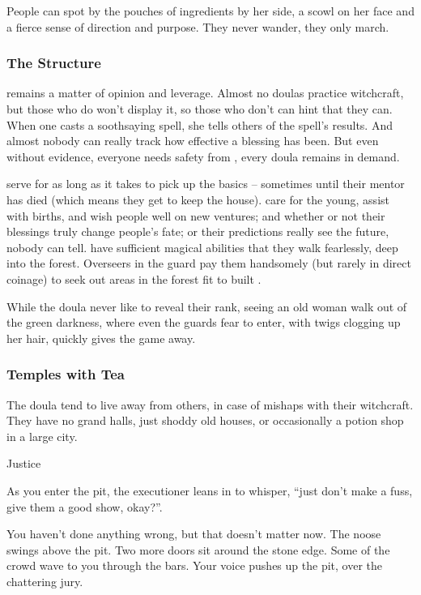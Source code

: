 \begin{multicols}{2}
People can spot  by the pouches of \glspl{ingredient} by her side, a scowl on her face and a fierce sense of direction and purpose.
They never wander, they only march.

\subsubsection{The Structure}
remains a matter of opinion and leverage.
Almost no \glspl{doula} practice \gls{witchcraft}, but those who do won't display it, so those who don't can hint that they can.
When one casts a soothsaying spell, she tells others of the spell's results.
And almost nobody can really track how effective a blessing has been.
But even without evidence, everyone needs safety from \hphantom{Nulla}, every \gls{doula} remains in demand.

\begin{description}
  serve for as long as it takes to pick up the basics -- sometimes until their mentor has died (which means they get to keep the house).
  care for the young, assist with births, and wish people well on new ventures; and whether or not their blessings truly change people's fate; or their predictions really see the future, nobody can tell.
  have sufficient magical abilities that they walk fearlessly, deep into the forest.
  Overseers in the \gls{guard} pay them handsomely (but rarely in direct coinage) to seek out areas in the forest fit to built .

  While the \gls{doula} never like to reveal their rank, seeing an old woman walk out of the green darkness, where even the \glspl{guard} fear to enter, with twigs clogging up her hair, quickly gives the game away.
\end{description}

\subsubsection{Temples with Tea}
The \gls{doula} tend to live away from others, in case of mishaps with their \gls{witchcraft}.
They have no grand halls, just shoddy old houses, or occasionally a potion shop in a large city.

  {Justice}%
  {
    As you enter the pit, the executioner leans in to whisper, ``just don't make a fuss, give them a good show, okay?''.

    You haven't done anything wrong, but that doesn't matter now.
    The noose swings above the pit.
    Two more doors sit around the stone edge.
    Some of the crowd wave to you through the bars.
    Your voice pushes up the pit, over the chattering jury.

}
\end{multicols}
